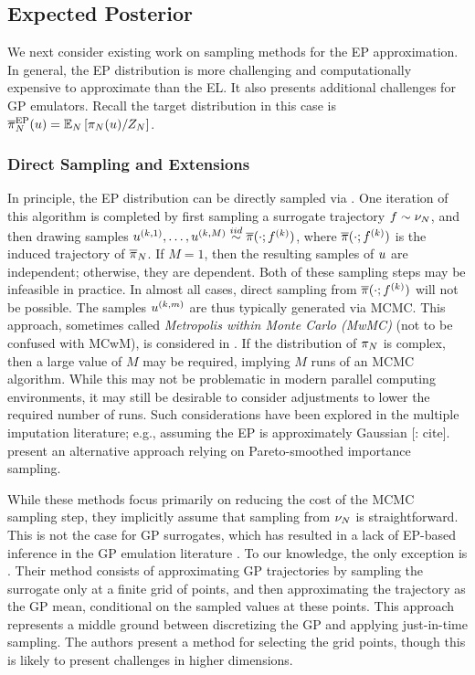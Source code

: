 \documentclass[12pt]{article}
\begin{document}
\subsection{Expected Posterior}
We next consider existing work on sampling methods for the EP approximation. In general, the
EP distribution is more challenging and computationally expensive to approximate than the EL. It also presents
additional challenges for GP emulators. Recall the target distribution in this case is 
$\overline{\pi}_{N}^{\mathrm{EP}}(u) = \mathbb{E}_{N}\left[\pi_{N}(u)/Z_{N} \right]$.

\subsubsection{Direct Sampling and Extensions}
In principle, the EP distribution can be directly sampled via .
One iteration of this algorithm is completed by first sampling 
a surrogate trajectory $f \sim \nu_{N}$, and then 
drawing samples 
$u^{(k, 1)}, \dots, u^{(k, M)} \overset{iid}{\sim} \overline{\pi}(\cdot; f^{(k)})$,
where $\overline{\pi}(\cdot; f^{(k)})$ is the induced trajectory of $\overline{\pi}_{N}$.
If $M = 1$, then the resulting samples of $u$ are independent; otherwise, they are dependent.
Both of these sampling steps may be infeasible in practice. In almost all cases, direct sampling from 
$\overline{\pi}(\cdot; f^{(k)})$ will not be possible. The samples $u^{(k, m)}$ are thus
typically generated via MCMC. This approach, sometimes called \textit{Metropolis within Monte Carlo (MwMC)} 
(not to be confused with MCwM), is considered in \citep{garegnani2021NoisyMCMC,BurknerSurrogate}.
If the distribution of $\pi_{N}$ is complex, then a large value of $M$ may be required, implying 
$M$ runs of an MCMC algorithm. While this may not be problematic in modern parallel computing 
environments, it may still be desirable to consider adjustments to lower the required number of runs. 
Such considerations 
have been explored in the multiple imputation literature; e.g., assuming the EP is approximately Gaussian [\todo: cite].
\citep{BurknerTwoStep} present an alternative approach relying on Pareto-smoothed importance sampling. 
 
While these methods focus primarily on reducing the cost of the MCMC sampling step, they implicitly assume
that sampling from $\nu_{N}$ is straightforward. This is not the case for GP surrogates, which 
has resulted in a lack of EP-based inference in the GP emulation literature \citep{VehtariParallelGP,StuartTeck2}. 
To our knowledge, the only exception is \citet{trainDynamics}.
Their method consists of approximating GP 
trajectories by sampling the surrogate only at a finite grid of points, and then approximating 
the trajectory as the GP mean, conditional on the sampled values at these points. This approach represents
a middle ground between discretizing the GP and applying just-in-time sampling. The authors present a method
for selecting the grid points, though this is likely to present challenges in higher dimensions. 
\end{document}
